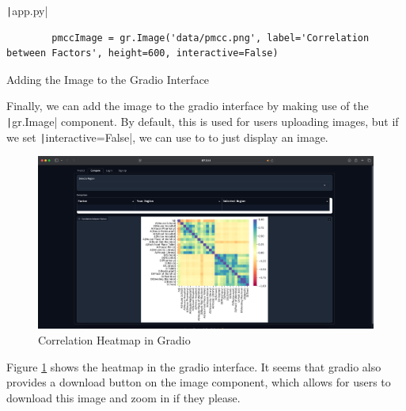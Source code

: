 \documentclass[12pt]{report}
\newcommand{\pil}[1]{\protect\texttt|#1|}
\begin{document}
\begin{listing}[H]
\pil{app.py}
\begin{verbatim}
        pmccImage = gr.Image('data/pmcc.png', label='Correlation between Factors', height=600, interactive=False)
\end{verbatim}
\caption{Adding the Image to the Gradio Interface}\label{cs:pmccInGradio}
\end{listing}

Finally, we can add the image to the gradio interface by making use of the \pil{gr.Image} component. By default, this is used for users uploading images, but if we set \pil{interactive=False}, we can use to to just display an image.

\begin{figure}[H]
\centering
\includegraphics[width=14cm]{ss18.3.png}
\caption{Correlation Heatmap in Gradio}\label{fig:ss18.3}
\end{figure}

Figure \ref{fig:ss18.3} shows the heatmap in the gradio interface. It seems that gradio also provides a download button on the image component, which allows for users to download this image and zoom in if they please.

\begin{center}
\end{center}
\end{document}
